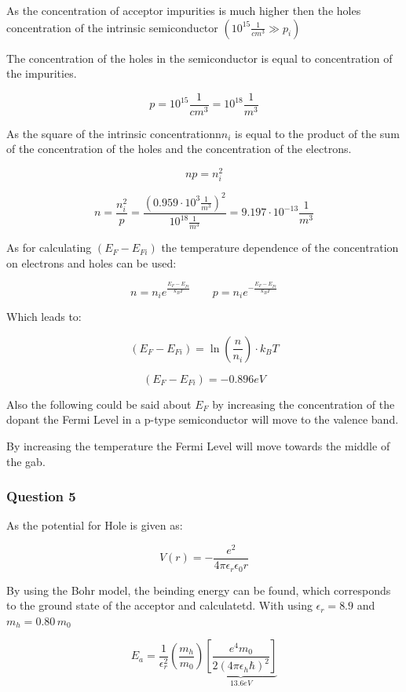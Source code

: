As the concentration of acceptor impurities is much higher then
the holes concentration of the intrinsic semiconductor 
$(10^{15} \frac{1}{cm^3} \gg p_i)$

The concentration of the holes in the semiconductor is equal to concentration
of the impurities.

$$p = 10^{15} \frac{1}{cm^3} = 10^{18} \frac{1}{m^3}$$

As the square of the intrinsic concentrationn$n_i$ is equal to the product
of the sum of the concentration of the holes and the concentration of the
electrons.

$$np = n_i^2$$

$$n = \frac{n_i^2}{p} = \frac{(0.959 \cdot 10^3 \frac{1}{m^3})^2}{10^{18} \frac{1}{m^3}} = 9.197 \cdot 10^{-13} \frac{1}{m^3}$$

As for calculating $(E_F-E_{Fi})$ the temperature dependence of the
concentration on electrons and holes can be used:

$$n = n_i e^{\frac{E_F-E_{Fi}}{k_BT}}  \qquad p = n_i e^{-\frac{E_F-E_{Fi}}{k_BT}}$$

Which leads to:

$$(E_F-E_{Fi}) = \ln\left( \frac{n}{n_i} \right) \cdot k_BT$$

$$(E_F-E_{Fi}) = -0.896 eV $$

Also the following could be said about $E_F$
by increasing the concentration of the dopant 
the Fermi Level in a p-type semiconductor will
move to the valence band.

By increasing the temperature the Fermi Level
will move towards the middle of the gab.

\subsubsection*{Question 5}

As the potential for Hole is given as:

\begin{equation}
  V(r) = -\frac{e^2}{4\pi \epsilon_r \epsilon_0 r}
\end{equation}

By using the Bohr model, the beinding energy can be found, which
corresponds to the ground state of the acceptor and calculatetd.
With using $\epsilon_r = 8.9$ and $m_h = 0.80\,m_0$


$$
E_a = \frac{1}{\epsilon_r^2} \left(\frac{m_h}{m_0}\right) \underbrace{\left[\frac{e^4m_0}{2(4\pi\epsilon_h\hbar)^2}\right]}_{13.6eV}
$$

